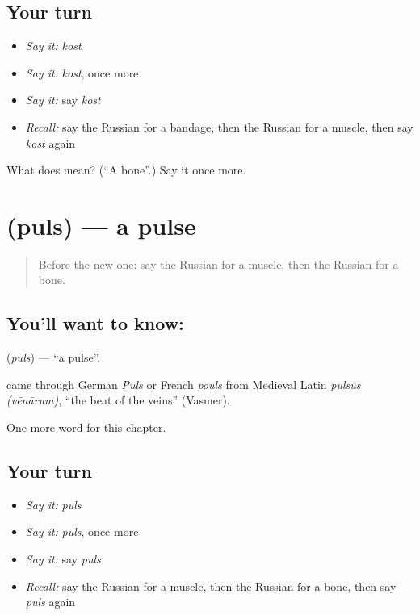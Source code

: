 \subsection*{Your turn}
\begin{itemize}
\raggedright
  \item \emph{Say it:} \emph{kost}
  \item \emph{Say it:} \emph{kost}, once more
  \item \emph{Say it:} say \emph{kost}
  \item \emph{Recall:} say the Russian for a bandage, then the Russian for a muscle, then say \emph{kost} again
\end{itemize}

\begin{tcolorbox}[breakable,colback=teal!4,colframe=teal!35!black,title={Before you move on}]
What does  mean? (\textquotedblleft{}A bone\textquotedblright{}.) Say it once more.
\end{tcolorbox}
\section[\texorpdfstring{\ru{пульс} (puls)}{пульс (puls)}]{ (puls) — a pulse}

\label{lesson:RU-C211-puls}



\begin{quote}
Before the new one: say the Russian for a muscle, then the Russian for a bone.
\end{quote}

\subsection*{You'll want to know: }
\textbf{} (\emph{puls}) — \textquotedblleft{}a pulse\textquotedblright{}.

\begin{cousinweb}
\textbf{} came through German \emph{Puls} or French \emph{pouls} from Medieval Latin \emph{pulsus (vēnārum)}, \textquotedblleft{}the beat of the veins\textquotedblright{} (Vasmer).
\end{cousinweb}

\begin{grammarlens}[title={What you've built}]
One more word for this chapter.
\end{grammarlens}

\subsection*{Your turn}
\begin{itemize}
\raggedright
  \item \emph{Say it:} \emph{puls}
  \item \emph{Say it:} \emph{puls}, once more
  \item \emph{Say it:} say \emph{puls}
  \item \emph{Recall:} say the Russian for a muscle, then the Russian for a bone, then say \emph{puls} again
\end{itemize}

